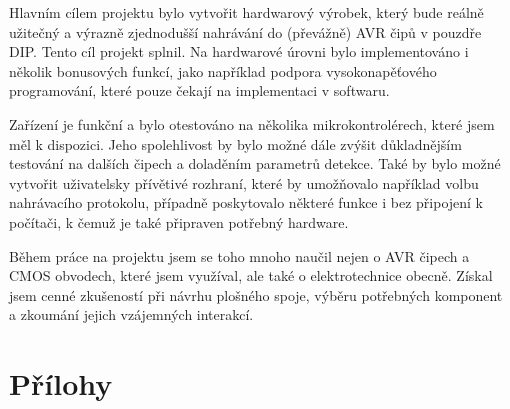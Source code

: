 \documentclass[11pt,a4paper,twoside,openright]{report}
\let\openright=\cleardoublepage
\begin{document}
Hlavním cílem projektu bylo vytvořit hardwarový výrobek, který bude reálně užitečný a výrazně zjednodušší nahrávání do (převážně) AVR čipů v pouzdře DIP. Tento cíl projekt splnil. Na hardwarové úrovni bylo implementováno i několik bonusových funkcí, jako například podpora vysokonapěťového programování, které pouze čekají na implementaci v softwaru.

Zařízení je funkční a bylo otestováno na několika mikrokontrolérech, které jsem měl k dispozici. Jeho spolehlivost by bylo možné dále zvýšit důkladnějším testování na dalších čipech a doladěním parametrů detekce. Také by bylo možné vytvořit uživatelsky přívětivé rozhraní, které by umožňovalo například volbu nahrávacího protokolu, případně poskytovalo některé funkce i bez připojení k počítači, k čemuž je také připraven potřebný hardware.

Během práce na projektu jsem se toho mnoho naučil nejen o AVR čipech a CMOS obvodech, které jsem využíval, ale také o elektrotechnice obecně. Získal jsem cenné zkušeností při návrhu plošného spoje, výběru potřebných komponent a zkoumání jejich vzájemných interakcí.  


\printbibliography[title={Seznam použité literatury},heading={bibintoc}]

\openright
\listoffigures
{}


\part*{Přílohy}
\appendix

\renewcommand{\thefigure}{A.\arabic{figure}}

\setcounter{figure}{0}
\end{document}
